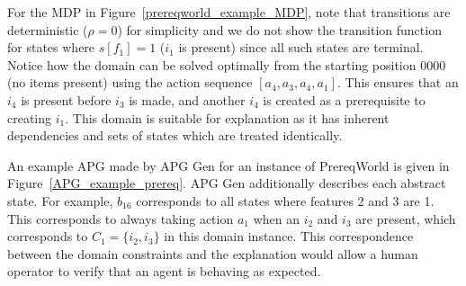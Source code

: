 \documentclass[letterpaper]{article} %
\begin{document}
For the MDP in Figure~\ref{prereqworld_example_MDP}, 
note that transitions are deterministic ($\rho = 0$) for simplicity and we do not show the transition function for states where $s[f_1] = 1$ ($i_1$ is present) since all such states are terminal. 
Notice how the domain can be solved optimally from the starting position $0000$ (no items present) using the action sequence $[a_4, a_3, a_4, a_1]$. 
This ensures that an $i_4$ is present before $i_3$ is made, and another $i_4$ is created as a prerequisite to creating $i_1$. 
This domain is suitable for explanation as it has inherent dependencies and sets of states which are treated identically.

An example APG made by APG Gen for an instance of PrereqWorld is given in Figure~\ref{APG_example_prereq}. APG Gen additionally describes each abstract state. For example, $b_{16}$ corresponds to all states where features 2 and 3 are 1. This corresponds to always taking action $a_1$ when an $i_2$ and $i_3$ are present, which corresponds to $C_1 = \{i_2, i_3\}$ in this domain instance. This correspondence between the domain constraints and the explanation would allow a human operator to verify that an agent is behaving as expected.
\end{document}
